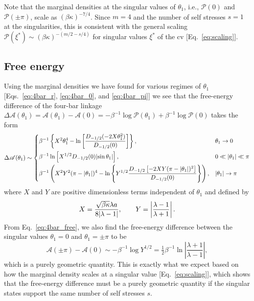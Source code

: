 Note that the marginal densities at the singular values of $\theta_{1}$, i.e., $\mathscr{P}(0)$ and $\mathscr{P}(\pm\pi)$, scale as $(\beta\kappa)^{-7/4}$.
Since $m = 4$ and the number of self stresses $s = 1$ at the singularities, this is consistent with the general scaling $\mathscr{P}(\xi^{*}) \sim (\beta\kappa)^{-(m/2 - s/4)}$ for singular values $\xi^{*}$ of the \ac{cv} [Eq.~\eqref{eq:scaling}].

\subsection{Free energy}

Using the marginal densities we have found for various regimes of $\theta_{1}$ [Eqs.~\eqref{eq:4bar_r}, \eqref{eq:4bar_0}, and \eqref{eq:4bar_pi}] we see that the free-energy difference of the four-bar linkage $\Delta\mathscr{A}(\theta_1) = \mathscr{A}(\theta_1) - \mathscr{A}(0) = -\beta^{-1}\log{\mathscr{P}(\theta_1)} + \beta^{-1}\log{\mathscr{P}(0)}$ takes the form
%
\begin{equation}
  \Delta\mathscr{A}(\theta_1) \sim
\begin{dcases}
  \beta^{-1}\left\{X^2\theta_1^4 - \ln\left[\dfrac{D_{-1/2}(-2X\theta_1^2)}{D_{-1/2}(0)}\right]\right\}, & \theta_1 \to 0\\
  \beta^{-1}\ln\left[X^{1/2}D_{-1/2}(0)\lvert\sin{\theta_1}\rvert\right], & 0 \ll \lvert\theta_1\rvert \ll \pi\\
  \beta^{-1}\left(X^2Y^2(\pi - \lvert\theta_1\rvert)^4 - \ln\left\{Y^{1/2}\dfrac{D_{-1/2}\left[-2XY(\pi - \lvert\theta_1\rvert)^2\right]}{D_{-1/2}(0)}\right\}\right), & \lvert\theta_1\rvert \to \pi
\end{dcases}
  \label{eq:4bar_free}
\end{equation}
%
where $X$ and $Y$ are positive dimensionless terms independent of $\theta_1$ and defined by
%
\begin{equation}
  X = \frac{\sqrt{\beta\kappa}\lambda a}{8\lvert\lambda-1\rvert},\qquad
  Y = \left|\frac{\lambda-1}{\lambda+1}\right|.
  \label{eq:XandY}
\end{equation}
%
From Eq.~\eqref{eq:4bar_free}, we also find the free-energy difference between the singular values $\theta_{1} = 0$ and $\theta_{1} = \pm\pi$ to be
%
\begin{equation}
  \mathscr{A}(\pm\pi) - \mathscr{A}(0) \sim -\beta^{-1}\log{Y^{1/2}} = \tfrac{1}{2}\beta^{-1}\ln\left|\frac{\lambda + 1}{\lambda - 1}\right|,
\end{equation}
%
which is a purely geometric quantity.
This is exactly what we expect based on how the marginal density scales at a singular value [Eq.~\eqref{eq:scaling}], which shows that the free-energy difference must be a purely geometric quantity if the singular states support the same number of self stresses $s$.
